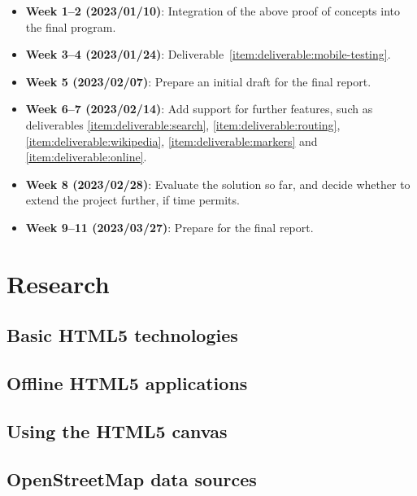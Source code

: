\documentclass[]{final_report}
\begin{document}
\begin{itemize}
    \item \textbf{Week 1--2 (2023/01/10)}: Integration of the above proof of concepts into the final program.
    \item \textbf{Week 3--4 (2023/01/24)}: Deliverable~\ref{item:deliverable:mobile-testing}.
    \item \textbf{Week 5 (2023/02/07)}: Prepare an initial draft for the final report.
    \item \textbf{Week 6--7 (2023/02/14)}: Add support for further features, such as deliverables \ref{item:deliverable:search}, \ref{item:deliverable:routing}, \ref{item:deliverable:wikipedia}, \ref{item:deliverable:markers} and \ref{item:deliverable:online}.
    \item \textbf{Week 8 (2023/02/28)}: Evaluate the solution so far, and decide whether to extend the project further, if time permits.
    \item \textbf{Week 9--11 (2023/03/27)}: Prepare for the final report.
\end{itemize}

\chapter{Research}

\section{Basic HTML5 technologies}


\section{Offline HTML5 applications}\label{sec:offline-html-applications}



\section{Using the HTML5 canvas}



\section{OpenStreetMap data sources}\label{sec:osm-data-sources}
\end{document}
